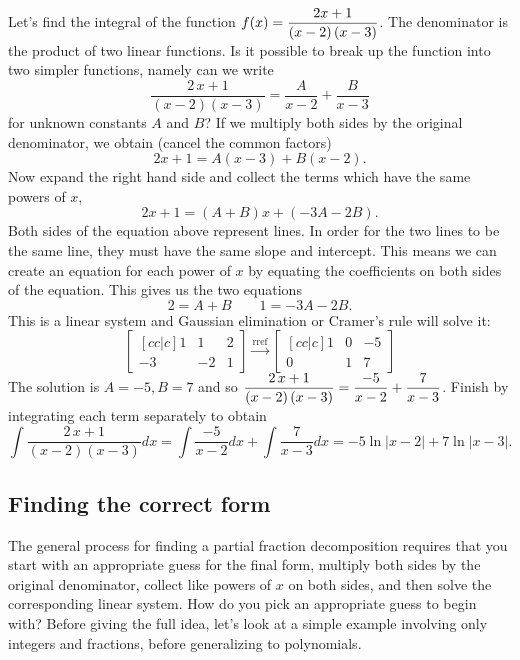 \begin{example}
Let's find the integral of the function $\displaystyle f(x)= {\frac {2x+1}{ \left( x-2 \right)  \left( x-3 \right) }}$. The denominator is the product of two linear functions. Is it possible to break up the function into two simpler functions, namely can we write 
$${\frac {2\,x+1}{ \left( x-2 \right)  \left( x-3 \right) }}={\frac {A}{
x-2}}+{\frac {B}{x-3}}$$
for unknown constants $A$ and $B$? If we multiply both sides by the original denominator, we obtain (cancel the common factors)
$$2x+1 = A(x-3)+B(x-2).$$
Now expand the right hand side and collect the terms which have the same powers of $x$, 
$$2x+1 = (A+B)x+(-3A-2B).$$
Both sides of the equation above represent lines. In order for the two lines to be the same line, they must have the same slope and intercept.  This means we can create an equation for each power of $x$ by equating the coefficients on both sides of the equation.  This gives us the two equations
$$2=A+B \quad \quad 1=-3A-2B.$$
This is a linear system and Gaussian elimination or Cramer's rule will solve it:
$$
\begin{bmatrix}[cc|c]
1&1&2\\
-3&-2&1
\end{bmatrix}
\xrightarrow{\text{rref}}
\begin{bmatrix}[cc|c]
1&0&-5\\
0&1&7
\end{bmatrix}
$$
The solution is $A=-5,B=7$ and so $\displaystyle{\frac {2\,x+1}{ \left( x-2 \right)  \left( x-3 \right) }}={\frac {-5}{
x-2}}+{\frac {7}{x-3}}$. Finish by integrating each term separately to obtain 
$$\int{\frac {2\,x+1}{ \left( x-2 \right)  \left( x-3 \right) }}dx 
= \int {\frac {-5}{x-2}} dx +\int{\frac {7}{x-3}}dx
= {-5}\ln|{x-2}|+7\ln|{x-3}|.
$$
\end{example}

\subsection{Finding the correct form}
The general process for finding a partial fraction decomposition requires that you start with an appropriate guess for the final form, multiply both sides by the original denominator, collect like powers of $x$ on both sides, and then solve the corresponding linear system. How do you pick an appropriate guess to begin with?  Before giving the full idea, let's look at a simple example involving only integers and fractions, before generalizing to polynomials.

